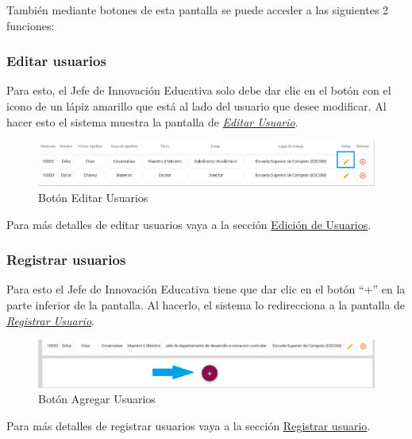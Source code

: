 También mediante botones de esta pantalla se puede acceder a las siguientes 2 funciones:

\subsubsection{Editar usuarios}

Para esto, el Jefe de Innovación Educativa solo debe dar clic en el botón con el icono de un lápiz amarillo que está al lado del usuario que desee modificar. Al hacer esto el sistema muestra la pantalla  de \hyperlink{editarUs}{\textit{Editar Usuario}}.

\begin{figure}[H]
	\centering
	\hypertarget{editar}{\includegraphics[width=0.7\linewidth]{images/SP5/BtnEditar}}
	\caption{Botón Editar Usuarios}
	\label{editar}
\end{figure}

Para más detalles de editar usuarios vaya a la sección \hyperlink{editar-user}{Edición de Usuarios}.

\subsubsection{Registrar  usuarios}

Para esto el Jefe de Innovación Educativa tiene que dar clic en el botón “+” en la parte inferior de la pantalla. Al hacerlo, el sistema  lo redirecciona a la pantalla de \hyperlink{registrarUs}{\textit{Registrar Usuario}}.

\begin{figure}[H]
	\centering
	\hypertarget{add}{\includegraphics[width=0.7\linewidth]{images/SP5/BtnAgregar}}
	\caption{Botón Agregar Usuarios}
	\label{add}
\end{figure}

Para más detalles de registrar usuarios vaya a la sección \hyperlink{registrar-Us}{Registrar usuario}.

